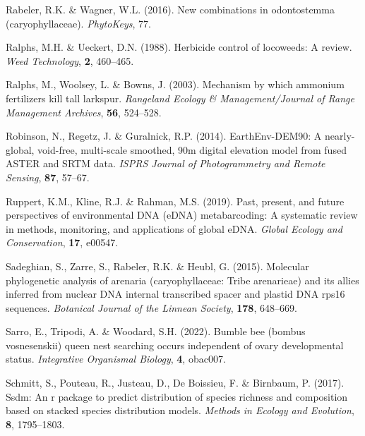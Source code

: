 \documentclass[
]{article}
\newlength{\cslhangindent}
\newlength{\cslentryspacingunit} %
\newenvironment{CSLReferences}[2] %
 {%
  \setlength{\parindent}{0pt}
  \ifodd #1
  \let\oldpar\par
  \def\par{\hangindent=\cslhangindent\oldpar}
  \fi
  \setlength{\parskip}{#2\cslentryspacingunit}
 }%
 {}
\begin{document}
\begin{CSLReferences}{1}{0}
\leavevmode{}%
Rabeler, R.K. \& Wagner, W.L. (2016). New combinations in odontostemma
(caryophyllaceae). \emph{PhytoKeys}, 77.

\leavevmode{}%
Ralphs, M.H. \& Ueckert, D.N. (1988). Herbicide control of locoweeds: A
review. \emph{Weed Technology}, \textbf{2}, 460--465.

\leavevmode{}%
Ralphs, M., Woolsey, L. \& Bowns, J. (2003). Mechanism by which ammonium
fertilizers kill tall larkspur. \emph{Rangeland Ecology \&
Management/Journal of Range Management Archives}, \textbf{56}, 524--528.

\leavevmode{}%
Robinson, N., Regetz, J. \& Guralnick, R.P. (2014). EarthEnv-DEM90: A
nearly-global, void-free, multi-scale smoothed, 90m digital elevation
model from fused ASTER and SRTM data. \emph{ISPRS Journal of
Photogrammetry and Remote Sensing}, \textbf{87}, 57--67.

\leavevmode{}%
Ruppert, K.M., Kline, R.J. \& Rahman, M.S. (2019). Past, present, and
future perspectives of environmental DNA (eDNA) metabarcoding: A
systematic review in methods, monitoring, and applications of global
eDNA. \emph{Global Ecology and Conservation}, \textbf{17}, e00547.

\leavevmode{}%
Sadeghian, S., Zarre, S., Rabeler, R.K. \& Heubl, G. (2015). Molecular
phylogenetic analysis of arenaria (caryophyllaceae: Tribe arenarieae)
and its allies inferred from nuclear DNA internal transcribed spacer and
plastid DNA rps16 sequences. \emph{Botanical Journal of the Linnean
Society}, \textbf{178}, 648--669.

\leavevmode{}%
Sarro, E., Tripodi, A. \& Woodard, S.H. (2022). Bumble bee (bombus
vosnesenskii) queen nest searching occurs independent of ovary
developmental status. \emph{Integrative Organismal Biology}, \textbf{4},
obac007.

\leavevmode{}%
Schmitt, S., Pouteau, R., Justeau, D., De Boissieu, F. \& Birnbaum, P.
(2017). Ssdm: An r package to predict distribution of species richness
and composition based on stacked species distribution models.
\emph{Methods in Ecology and Evolution}, \textbf{8}, 1795--1803.


\end{CSLReferences}
\end{document}
